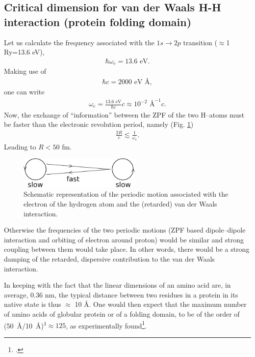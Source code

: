 \begin{subappendices}
 \subsection{Critical dimension for van der Waals H-H interaction (protein folding domain)}
 Let us calculate the frequency associated with the $1s\to 2p$ transition ($\approx$1 Ry=13.6 eV),
 \begin{align}\label{eq2.D.22}
\hbar\omega_e=13.6\text{ eV}.    
 \end{align} 
 Making use of
 \begin{align}\label{eq2.D.23}
 \hbar c=2000\text{ eV \AA},
 \end{align} 
 one can write
 \begin{align}\label{eq2.D.24}
 \omega_e=\frac{13.6\text{ eV}}{\hbar c}c\approx 10^{-2}\text{ \AA}^{-1}c.
 \end{align} 
 Now, the exchange of ``information'' between the ZPF of the two H--atoms must be faster than the electronic revolution period, namely (Fig. \ref{fig2.D.6})
  \begin{align}\label{eq2.D.25}
  \frac{2R}{c}\lesssim\frac{1}{\omega_e}.
  \end{align} 
  Leading to $R<50$ fm.
       \begin{figure}[h]
        \centerline{\includegraphics*[width=6cm,angle=0]{nutshell/figs/fig2D6_v2.pdf}}
        \caption{Schematic representation of the periodic motion associated with the electron of the hydrogen atom and the (retarded) van der Waals interaction.}\label{fig2.D.6}
        \end{figure}
 
 Otherwise the frequencies of the two periodic motions (ZPF based dipole--dipole interaction and orbiting of electron around proton) would be similar and strong coupling between them would take place. In other words, there would be a strong damping of the retarded, dispersive contribution to the van der Waals interaction.
 
 In keeping with the fact that the linear dimensions of an amino acid are, in average, 0.36 nm, the typical distance between two residues in a protein in its native state is thus $\approx$ 10 \AA. One would then expect that the maximum number of amino acids of globular protein or of a folding domain, to be of the order of \mbox{(50 \AA/10 \AA)$^{3}\approx 125$}, as experimentally found\footnote{\cite{Rost:97}.}.

\end{subappendices}
